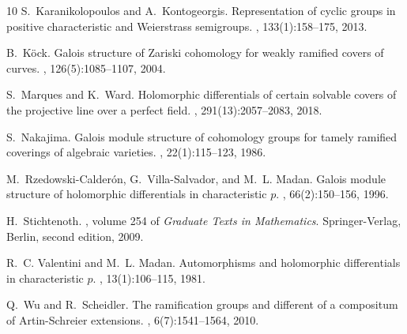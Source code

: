 \documentclass{amsart}
\numberwithin{equation}{section}
\numberwithin{table}{section}
\theoremstyle{plain}
\theoremstyle{definition}
\theoremstyle{remark}
\begin{document}
\begin{thebibliography}{10}
S.~Karanikolopoulos and A.~Kontogeorgis.
\newblock Representation of cyclic groups in positive characteristic and
  {W}eierstrass semigroups.
, 133(1):158--175, 2013.

B.~K\"{o}ck.
\newblock Galois structure of {Z}ariski cohomology for weakly ramified covers
  of curves.
, 126(5):1085--1107, 2004.

S.~Marques and K.~Ward.
\newblock Holomorphic differentials of certain solvable covers of the
  projective line over a perfect field.
, 291(13):2057--2083, 2018.

S.~Nakajima.
\newblock Galois module structure of cohomology groups for tamely ramified
  coverings of algebraic varieties.
, 22(1):115--123, 1986.

M.~Rzedowski-Calder{\'o}n, G.~Villa-Salvador, and M.~L. Madan.
\newblock Galois module structure of holomorphic differentials in
  characteristic {$p$}.
, 66(2):150--156, 1996.

H.~Stichtenoth.
, volume 254 of {\em
  Graduate Texts in Mathematics}.
\newblock Springer-Verlag, Berlin, second edition, 2009.

R.~C. Valentini and M.~L. Madan.
\newblock Automorphisms and holomorphic differentials in characteristic {$p$}.
, 13(1):106--115, 1981.

Q.~Wu and R.~Scheidler.
\newblock The ramification groups and different of a compositum of
  {A}rtin-{S}chreier extensions.
, 6(7):1541--1564, 2010.

\end{thebibliography}
\end{document}
